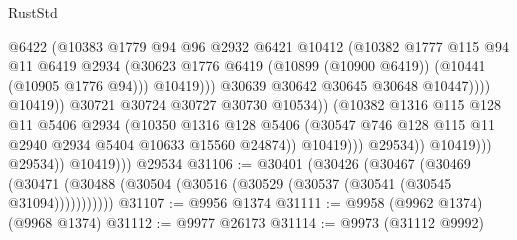\begin{lexlean}{RustStd}
\begin{coremodule}
                                              @6422
                                              (@10383
                                                @1779
                                                @94
                                                @96
                                                @2932
                                                @6421
                                                @10412
                                                (@10382
                                                  @1777
                                                  @115
                                                  @94
                                                  @11
                                                  @6419
                                                  @2934
                                                  (@30623
                                                    @1776
                                                    @6419
                                                    (@10899 (@10900 @6419))
                                                    (@10441 (@10905 @1776 @94)))
                                                  @10419)))
                                            @30639
                                            @30642
                                            @30645
                                            @30648
                                            @10447))))
                                    @10419))
                                @30721
                                @30724
                                @30727
                                @30730
                                @10534))
                            (@10382
                              @1316
                              @115
                              @128
                              @11
                              @5406
                              @2934
                              (@10350
                                @1316
                                @128
                                @5406
                                (@30547 @746 @128 @115 @11 @2940 @2934 @5404 @10633 @15560 @24874))
                              @10419)))
                        @29534))
                    @10419)))
              @29534))
          @10419)))
    @29534
@31106 := @30401
    (@30426
      (@30467
        (@30469 (@30471 (@30488 (@30504 (@30516 (@30529 (@30537 (@30541 (@30545 @31094)))))))))))
@31107 := @9956 @1374
@31111 := @9958 (@9962 @1374) (@9968 @1374)
@31112 := @9977 @26173
@31114 := @9973 (@31112 @9992)

\end{coremodule}
\end{lexlean}
